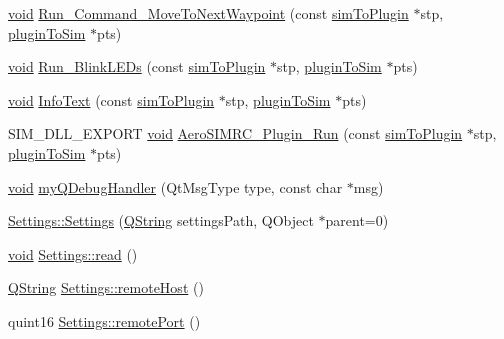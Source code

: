 \begin{DoxyCompactItemize}
\item 
\hyperlink{group___u_a_v_objects_plugin_ga444cf2ff3f0ecbe028adce838d373f5c}{void} \hyperlink{group___aero_sim_r_c_gaddb6627411fb8bfecba79d9eb336638e}{\-Run\-\_\-\-Command\-\_\-\-Move\-To\-Next\-Waypoint} (const \hyperlink{structsim_to_plugin}{sim\-To\-Plugin} $\ast$stp, \hyperlink{structplugin_to_sim}{plugin\-To\-Sim} $\ast$pts)
\item 
\hyperlink{group___u_a_v_objects_plugin_ga444cf2ff3f0ecbe028adce838d373f5c}{void} \hyperlink{group___aero_sim_r_c_ga857614faa8daba5d5f4fede066c51132}{\-Run\-\_\-\-Blink\-L\-E\-Ds} (const \hyperlink{structsim_to_plugin}{sim\-To\-Plugin} $\ast$stp, \hyperlink{structplugin_to_sim}{plugin\-To\-Sim} $\ast$pts)
\item 
\hyperlink{group___u_a_v_objects_plugin_ga444cf2ff3f0ecbe028adce838d373f5c}{void} \hyperlink{group___aero_sim_r_c_gae510a372f225654c1363040357ba2c55}{\-Info\-Text} (const \hyperlink{structsim_to_plugin}{sim\-To\-Plugin} $\ast$stp, \hyperlink{structplugin_to_sim}{plugin\-To\-Sim} $\ast$pts)
\item 
\-S\-I\-M\-\_\-\-D\-L\-L\-\_\-\-E\-X\-P\-O\-R\-T \hyperlink{group___u_a_v_objects_plugin_ga444cf2ff3f0ecbe028adce838d373f5c}{void} \hyperlink{group___aero_sim_r_c_ga90f7f2f84473fc876d3189d4659dcf1a}{\-Aero\-S\-I\-M\-R\-C\-\_\-\-Plugin\-\_\-\-Run} (const \hyperlink{structsim_to_plugin}{sim\-To\-Plugin} $\ast$stp, \hyperlink{structplugin_to_sim}{plugin\-To\-Sim} $\ast$pts)
\item 
\hyperlink{group___u_a_v_objects_plugin_ga444cf2ff3f0ecbe028adce838d373f5c}{void} \hyperlink{group___aero_sim_r_c_ga7b01eb4372b4aee0f4d26504cfcd02a7}{my\-Q\-Debug\-Handler} (\-Qt\-Msg\-Type type, const char $\ast$msg)
\item 
\hyperlink{group___aero_sim_r_c_ga93af04323b9db4a809d0376a1ea6a7ae}{\-Settings\-::\-Settings} (\hyperlink{group___u_a_v_objects_plugin_gab9d252f49c333c94a72f97ce3105a32d}{\-Q\-String} settings\-Path, \-Q\-Object $\ast$parent=0)
\item 
\hyperlink{group___u_a_v_objects_plugin_ga444cf2ff3f0ecbe028adce838d373f5c}{void} \hyperlink{group___aero_sim_r_c_gac0f3ec889ab03b807e937580704a3ee9}{\-Settings\-::read} ()
\item 
\hyperlink{group___u_a_v_objects_plugin_gab9d252f49c333c94a72f97ce3105a32d}{\-Q\-String} \hyperlink{group___aero_sim_r_c_ga488c7f5a87b95d6b3e0b8d8c0647f984}{\-Settings\-::remote\-Host} ()
\item 
quint16 \hyperlink{group___aero_sim_r_c_gafd3c776de1db18a53414fc9ff7d5f656}{\-Settings\-::remote\-Port} ()

\end{DoxyCompactItemize}
